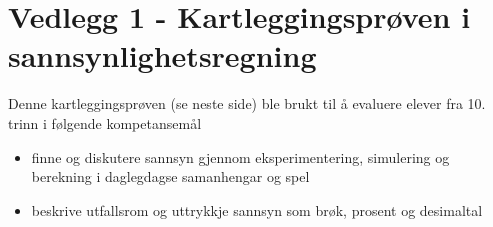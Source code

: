 \documentclass[main.tex]{subfiles}
\begin{document}
\appendix
\section*{Vedlegg 1 - Kartleggingsprøven i sannsynlighetsregning}
\label{prove}
Denne kartleggingsprøven (se neste side) ble brukt til å evaluere elever fra 10. trinn
i følgende kompetansemål 
\begin{itemize}
\item finne og diskutere sannsyn gjennom eksperimentering, simulering og berekning i daglegdagse samanhengar og spel
\item beskrive utfallsrom og uttrykkje sannsyn som brøk, prosent og desimaltal
\end{itemize}


\end{document}
